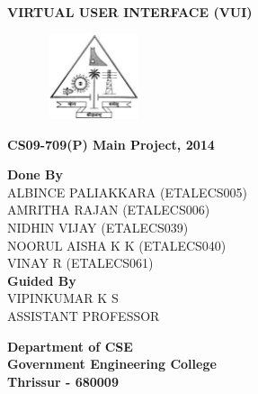 \documentclass[12pt]{report}
\date{\today}
\begin{document}
\begin{center}
\thispagestyle{empty}
\textbf {\LARGE VIRTUAL USER INTERFACE (VUI) }\\
\vspace{1cm}


\begin{figure}[h]
\centering
\includegraphics[height=2.5cm,width=3cm]{1.jpg}
\end{figure}

\textbf {\LARGE CS09-709(P) Main Project, 2014}\\
\vspace{1.5cm}

\textbf{\Large Done By}\\
\vspace{.5cm}
\textsf {\Large ALBINCE PALIAKKARA (ETALECS005)}\\
\vspace{.1cm}
\textsf {\Large AMRITHA RAJAN      (ETALECS006)}\\
\vspace{.1cm}
\textsf {\Large NIDHIN VIJAY       (ETALECS039)}\\
\vspace{.1cm}
\textsf {\Large NOORUL AISHA K K   (ETALECS040)}\\
\vspace{.1cm}
\textsf {\Large VINAY R            (ETALECS061)}\\

\vspace{1.5cm}
\textbf {\Large Guided By}\\
\vspace{.5cm}
\textsf {\Large VIPINKUMAR K S}\\
\vspace{.2cm}
\textsf {\Large ASSISTANT PROFESSOR}\\
\vspace{1.8cm}

\vspace{.8cm}
\textbf {\LARGE Department of CSE}\\
\vspace{.5cm}
\textbf {\LARGE Government Engineering College}\\
\vspace{.5cm}
\textbf {\LARGE Thrissur - 680009}\\
\end{center}
\end{document}
